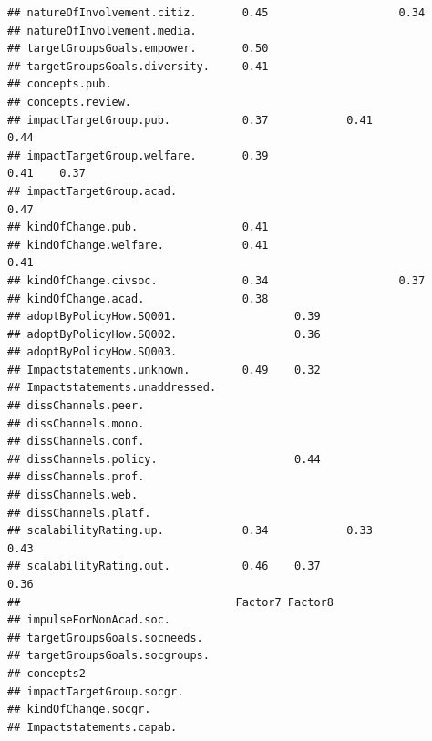 \documentclass[
]{article}
\begin{document}
\begin{verbatim}
## natureOfInvolvement.citiz.       0.45                    0.34                  
## natureOfInvolvement.media.                                                     
## targetGroupsGoals.empower.       0.50                                          
## targetGroupsGoals.diversity.     0.41                                          
## concepts.pub.                                                                  
## concepts.review.                                                               
## impactTargetGroup.pub.           0.37            0.41                    0.44  
## impactTargetGroup.welfare.       0.39                            0.41    0.37  
## impactTargetGroup.acad.                                                  0.47  
## kindOfChange.pub.                0.41                                          
## kindOfChange.welfare.            0.41                            0.41          
## kindOfChange.civsoc.             0.34                    0.37                  
## kindOfChange.acad.               0.38                                          
## adoptByPolicyHow.SQ001.                  0.39                                  
## adoptByPolicyHow.SQ002.                  0.36                                  
## adoptByPolicyHow.SQ003.                                                        
## Impactstatements.unknown.        0.49    0.32                                  
## Impactstatements.unaddressed.                                                  
## dissChannels.peer.                                                             
## dissChannels.mono.                                                             
## dissChannels.conf.                                                             
## dissChannels.policy.                     0.44                                  
## dissChannels.prof.                                                             
## dissChannels.web.                                                              
## dissChannels.platf.                                                            
## scalabilityRating.up.            0.34            0.33                    0.43  
## scalabilityRating.out.           0.46    0.37                            0.36  
##                                 Factor7 Factor8
## impulseForNonAcad.soc.                         
## targetGroupsGoals.socneeds.                    
## targetGroupsGoals.socgroups.                   
## concepts2                                      
## impactTargetGroup.socgr.                       
## kindOfChange.socgr.                            
## Impactstatements.capab.                        

\end{verbatim}
\end{document}
